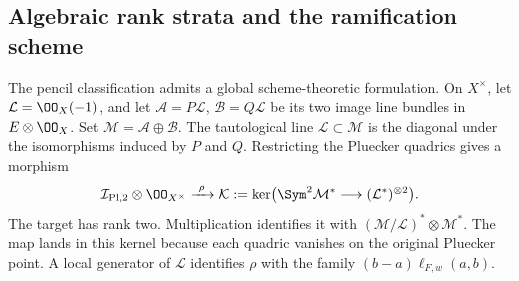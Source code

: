 \subsection{Algebraic rank strata and the ramification scheme}
\label{sec:global-pencil-strata}

The pencil classification admits a global scheme-theoretic formulation.
On \(X^\times\), let \(\mathcal L=\OO_X(-1)\), and let
\(\mathcal A=P\mathcal L\), \(\mathcal B=Q\mathcal L\)
be its two image line bundles in \(E\otimes\OO_X\).  Set
\(\mathcal M=\mathcal A\oplus\mathcal B\).  The tautological
line \(\mathcal L\subset\mathcal M\) is the diagonal under
the isomorphisms induced by \(P\) and \(Q\).  Restricting the
Pluecker quadrics gives a morphism
\begin{equation}\label{eq:global-pencil-bundle-morphism}
 \mathcal I_{\mathrm{Pl},2}\otimes\OO_{X^\times}
 \xrightarrow{\ \rho\ }
 \mathcal K:=\ker\bigl(\Sym^2\mathcal M^*
                         \longrightarrow(\mathcal L^*)^{\otimes2}\bigr).
\end{equation}
The target has rank two.  Multiplication identifies it with
\((\mathcal M/\mathcal L)^*\otimes\mathcal M^*\).
The map lands in this kernel because each quadric vanishes on the
original Pluecker point.  A local generator of \(\mathcal L\)
identifies \(\rho\) with the family
\((b-a)\ell_{F,w}(a,b)\).

